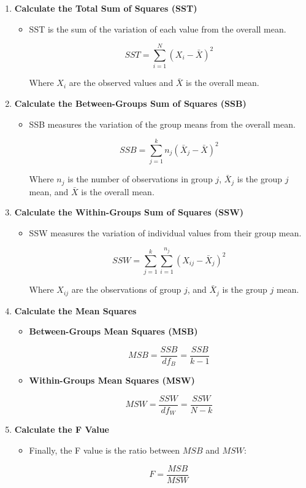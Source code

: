 \documentclass[conference]{IEEEtran}
\begin{document}
	\begin{enumerate}
		\item \textbf{Calculate the Total Sum of Squares (SST)}
		\begin{itemize}
			\item SST is the sum of the variation of each value from the overall mean.
			
			\[
			SST = \sum_{i=1}^{N} (X_i - \bar{X})^2
			\]
			
			Where \( X_i \) are the observed values and \( \bar{X} \) is the overall mean.
		\end{itemize}
		
		\item \textbf{Calculate the Between-Groups Sum of Squares (SSB)}
		\begin{itemize}
			\item SSB measures the variation of the group means from the overall mean.
			
			\[
			SSB = \sum_{j=1}^{k} n_j (\bar{X}_j - \bar{X})^2
			\]
			
			Where \( n_j \) is the number of observations in group \( j \), \( \bar{X}_j \) is the group \( j \) mean, and \( \bar{X} \) is the overall mean.
		\end{itemize}
		
		\item \textbf{Calculate the Within-Groups Sum of Squares (SSW)}
		\begin{itemize}
			\item SSW measures the variation of individual values from their group mean.
			
			\[
			SSW = \sum_{j=1}^{k} \sum_{i=1}^{n_j} (X_{ij} - \bar{X}_j)^2
			\]
			
			Where \( X_{ij} \) are the observations of group \( j \), and \( \bar{X}_j \) is the group \( j \) mean.
		\end{itemize}
		
		\item \textbf{Calculate the Mean Squares}
		\begin{itemize}
			\item \textbf{Between-Groups Mean Squares (MSB)}
			
			\[
			MSB = \frac{SSB}{df_B} = \frac{SSB}{k - 1}
			\]
			
			\item \textbf{Within-Groups Mean Squares (MSW)}
			
			\[
			MSW = \frac{SSW}{df_W} = \frac{SSW}{N - k}
			\]
		\end{itemize}
		
		\item \textbf{Calculate the F Value}
		\begin{itemize}
			\item Finally, the F value is the ratio between \( MSB \) and \( MSW \):
			
			\[
			F = \frac{MSB}{MSW}
			\]
		\end{itemize}
	\end{enumerate}
	
\end{document}

